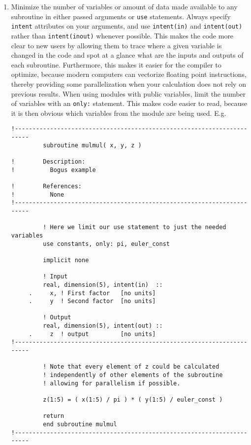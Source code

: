 \documentclass[letterpaper,12pt]{article}
\begin{document}
\begin{enumerate}
\item Minimize the number of variables or amount of data made available to any 
subroutine in either 
passed arguments or \texttt{use} statements.  Always specify \texttt{intent} 
attributes on your arguments, and use \texttt{intent(in)} 
and \texttt{intent(out)} rather than \texttt{intent(inout)} whenever possible.
This makes the code more clear to new users by allowing them to trace where a 
given variable is changed in the code and spot at a glance what are the inputs and
outputs of each subroutine.  Furthermore,
this makes it easier for the compiler to optimize, because modern computers can 
vectorize floating point instructions, thereby providing some 
parallelization when your calculation does not rely on previous results.
When using modules with public variables, limit 
the number of variables with an \texttt{only:} statement.  This makes code 
easier to read, because it is then obvious which variables from the module are being 
used.\newline
E.g.
\begin{verbatim}
!-----------------------------------------------------------------------
         subroutine mulmul( x, y, z )

!        Description:
!          Bogus example

!        References:
!          None
!-----------------------------------------------------------------------

         ! Here we limit our use statement to just the needed variables
         use constants, only: pi, euler_const 

         implicit none

         ! Input
         real, dimension(5), intent(in)  ::
     .     x, ! First factor   [no units]
     .     y  ! Second factor  [no units]

         ! Output 
         real, dimension(5), intent(out) :: 
     .     z  ! output         [no units]
!-----------------------------------------------------------------------

         ! Note that every element of z could be calculated 
         ! independently of other elements of the subroutine
         ! allowing for parallelism if possible.

         z(1:5) = ( x(1:5) / pi ) * ( y(1:5) / euler_const )

         return
         end subroutine mulmul
!-----------------------------------------------------------------------
\end{verbatim}


\end{enumerate}
\end{document}
